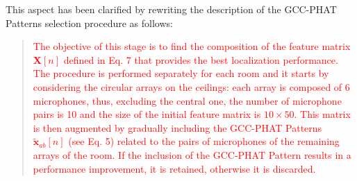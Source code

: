 \documentclass[11pt, technote, letterpaper, oneside, onecolumn]{IEEEtran}
\begin{document}
\begin{enumerate}
This aspect has been clarified by rewriting the description of the GCC-PHAT Patterns selection procedure as follows:
\begin{quote}
 \textcolor{red}{The objective of this stage is to find the composition of the feature matrix $\mathbf{X}[n]$ defined in Eq. 7 that provides the best localization performance. The procedure is performed separately for each room and it starts by considering the circular arrays on the ceilings: each array is composed of 6 microphones, thus, excluding the central one, the number of microphone pairs is 10 and the size of the initial feature matrix is $10 \times 50$. This matrix is then augmented by gradually including the GCC-PHAT Patterns $\mathbf{\tilde{x}}_{ab}[n]$ (see Eq. 5) related to the pairs of microphones of the remaining arrays of the room. If the inclusion of the GCC-PHAT Pattern results in a performance improvement, it is retained, otherwise it is discarded.}
\end{quote}


\end{enumerate}
\end{document}
